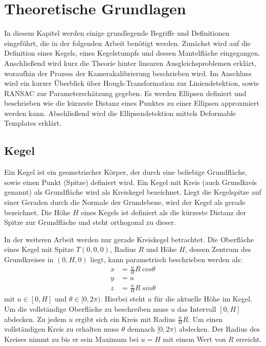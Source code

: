 \chapter{Theoretische Grundlagen}
\label{ch:theory}
In diesem Kapitel werden einige grundlegende Begriffe und Definitionen eingeführt, die in der folgenden Arbeit benötigt werden.
Zunächst wird auf die Definition eines Kegels, eines Kegelstumpfs und dessen Mantelfläche eingegangen.
Anschließend wird kurz die Theorie hinter linearen Ausgleichsproblemen erklärt, woraufhin der Prozess der Kamerakalibrierung
beschrieben wird.
Im Anschluss wird ein kurzer Überblick über Hough-Transformation zur Liniendetektion, sowie RANSAC zur Parameterschätzung gegeben.
Es werden Ellipsen definiert und beschrieben wie die kürzeste Distanz eines Punktes zu einer Ellipsen approxmiert werden kann.
Abschließend wird die Ellipsendetektion mittels Deformable Templates erklärt.

\section{Kegel}
\label{s:cone}

\begin{definition}[Kegel]
	Ein Kegel ist ein geometrischer Körper, der durch eine beliebige Grundfläche, sowie einen Punkt (Spitze) definiert wird.
	Ein Kegel mit Kreis (auch Grundkreis genannt) als Grundfläche wird als Kreiskegel bezeichnet. Liegt die Kegelspitze auf einer Geraden durch die Normale der Grundebene, wird der Kegel als gerade bezeichnet.
	Die Höhe $H$ eines Kegels ist definiert als die kürzeste Distanz der Spitze zur Grundfläche und steht orthogonal zu dieser. \cite{James1992}
\end{definition}

In der weiteren Arbeit werden nur gerade Kreiskegel betrachtet. Die Oberfläche eines Kegel mit Spitze $T(0,0,0)$, Radius $R$ und Höhe $H$, dessen Zentrum des Grundkreises in $(0,H,0)$ liegt, kann parametrisch beschrieben werden als:
\begin{equation} \label{eq:paramCone}
\begin{aligned}
x &= \frac{u}{H} R~cos \theta \\
y &= u \\
z &= \frac{u}{H} R~sin \theta
\end{aligned}
\end{equation} %
mit $u\in [0, H]$ und $\theta \in [0, 2\pi)$. Hierbei steht $u$ für die aktuelle Höhe im Kegel. Um die vollständige Oberfläche zu beschreiben muss $u$ das Intervall $[0, H]$ abdecken. Zu jedem $u$ ergibt sich ein Kreis mit Radius $\frac{u}{H} R$. Um einen vollständigen Kreis zu erhalten muss $\theta$ demnach $[0, 2\pi)$ abdecken. Der Radius des Kreises nimmt zu bis er sein Maximum bei $u = H$ mit einem Wert von $R$ erreicht.


